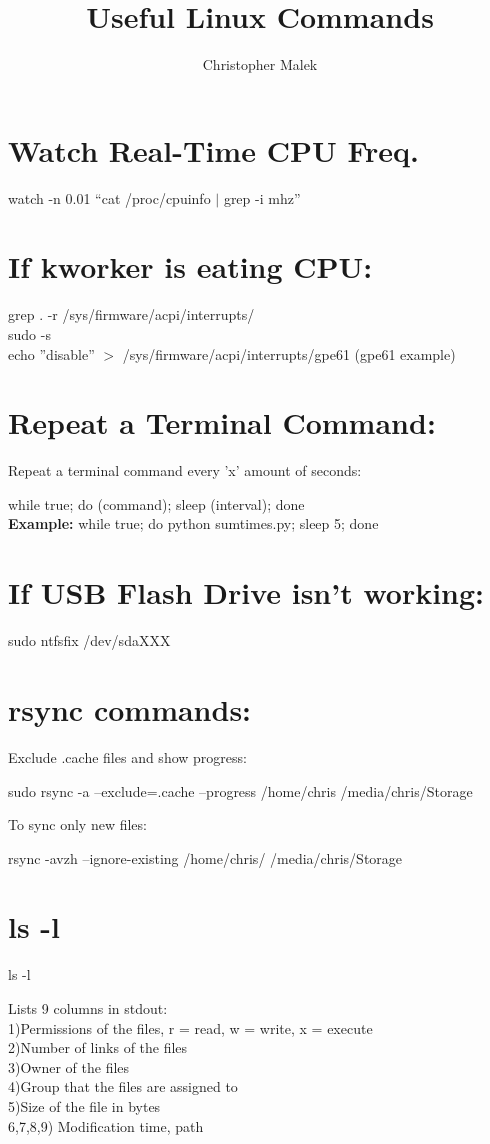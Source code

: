 \documentclass[10pt]{article}
\title{Useful Linux Commands}
\author{Christopher Malek}
\date{}
\newcommand{\bt}{\begin{tcolorbox}}
\newcommand{\et}{\end{tcolorbox}}
\begin{document}
\maketitle
\section{Watch Real-Time CPU Freq.}
\bt
watch -n 0.01 ``cat /proc/cpuinfo $|$ grep -i mhz''
\et

\section{If kworker is eating CPU:}
\bt
grep . -r /sys/firmware/acpi/interrupts/\\
sudo -s\\
echo ''disable'' $>$ /sys/firmware/acpi/interrupts/gpe61 (gpe61 example)
\et

\section{Repeat a Terminal Command:}
Repeat a terminal command every 'x' amount of seconds:
\bt
while true; do (command); sleep (interval); done\\
\textbf{Example:} while true; do python sumtimes.py; sleep 5; done
\et

\section{If USB Flash Drive isn't working:}
\bt
sudo ntfsfix /dev/sdaXXX
\et

\section{rsync commands:}
Exclude .cache files and show progress:
\bt
sudo rsync -a --exclude=.cache --progress /home/chris /media/chris/Storage
\et
\noindent To sync only new files:
\bt
rsync -avzh --ignore-existing /home/chris/ /media/chris/Storage
\et

\section{ls -l}
 \bt
   ls -l
 \et
\noindent Lists 9 columns in stdout:\\
1)Permissions of the files, r = read, w = write, x = execute\\
2)Number of links of the files\\
3)Owner of the files\\
4)Group that the files are assigned to\\
5)Size of the file in bytes\\
6,7,8,9) Modification time, path
\end{document}
